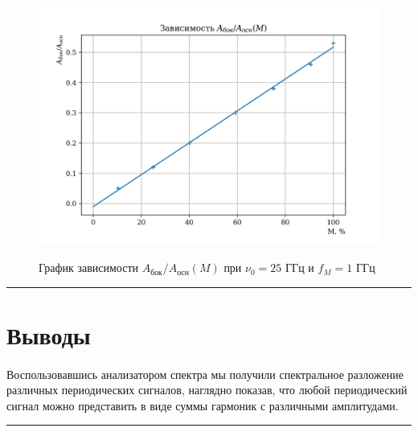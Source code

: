 \documentclass[a4paper,12pt]{article} %
\begin{document}
\begin{figure}
\begin{center}
\includegraphics[width=6in]{plot2.png}
\label{plot2}
\caption{График зависимости $A_\text{бок}/A_\text{осн} (M)$ при $\nu_0 = 25$ ГГц и $f_M = 1$ ГГц}
\end{center}
\end{figure}

\medskip\hrule\medskip

\section{Выводы}

\paragraph{} Воспользовавшись анализатором спектра мы получили спектральное разложение различных периодических сигналов, наглядно показав, что любой периодический сигнал можно представить в виде суммы гармоник с различными амплитудами.

\medskip\hrule\medskip
\end{document}
